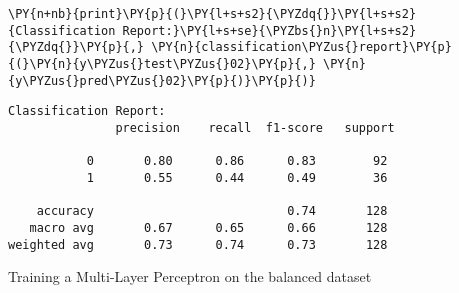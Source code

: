     \begin{tcolorbox}[breakable, size=fbox, boxrule=1pt, pad at break*=1mm,colback=cellbackground, colframe=cellborder]
\begin{Verbatim}[commandchars=\\\{\}]
\PY{n+nb}{print}\PY{p}{(}\PY{l+s+s2}{\PYZdq{}}\PY{l+s+s2}{Classification Report:}\PY{l+s+se}{\PYZbs{}n}\PY{l+s+s2}{\PYZdq{}}\PY{p}{,} \PY{n}{classification\PYZus{}report}\PY{p}{(}\PY{n}{y\PYZus{}test\PYZus{}02}\PY{p}{,} \PY{n}{y\PYZus{}pred\PYZus{}02}\PY{p}{)}\PY{p}{)}
\end{Verbatim}
\end{tcolorbox}

    \begin{Verbatim}[commandchars=\\\{\}]
Classification Report:
               precision    recall  f1-score   support

           0       0.80      0.86      0.83        92
           1       0.55      0.44      0.49        36

    accuracy                           0.74       128
   macro avg       0.67      0.65      0.66       128
weighted avg       0.73      0.74      0.73       128

    \end{Verbatim}

    Training a Multi-Layer Perceptron on the balanced dataset

